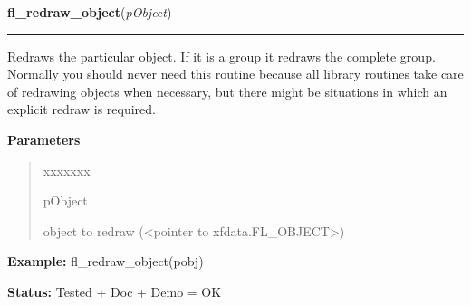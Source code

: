     \label{xformslib:library:fl_redraw_object}

    \vspace{0.5ex}

\hspace{.8\funcindent}\begin{boxedminipage}{\funcwidth}

    \raggedright \textbf{fl\_redraw\_object}(\textit{pObject})

    \vspace{-1.5ex}

    \rule{\textwidth}{0.5\fboxrule}
\setlength{\parskip}{2ex}
    Redraws the particular object. If it is a group it redraws the complete
    group. Normally you should never need this routine because all library 
    routines take care of redrawing objects when necessary, but there might
    be situations in which an explicit redraw is required.

\setlength{\parskip}{1ex}
      \textbf{Parameters}
      \vspace{-1ex}

      \begin{quote}
        \begin{Ventry}{xxxxxxx}

          \item[pObject]

          object to redraw ({\textless}pointer to 
          xfdata.FL\_OBJECT{\textgreater})

        \end{Ventry}

      \end{quote}

\textbf{Example:} fl\_redraw\_object(pobj)



\textbf{Status:} Tested + Doc + Demo = OK



    \end{boxedminipage}

    \label{xformslib:library:fl_scale_object}

    \vspace{0.5ex}

